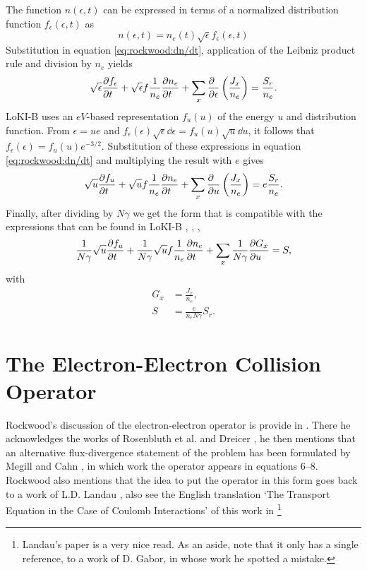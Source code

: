 \documentclass{book}
\begin{document}
The function $n(\epsilon,t)$ can be expressed in terms of a normalized distribution
function $f_\epsilon(\epsilon,t)$ as
\begin{equation}
	n(\epsilon,t) = n_e(t)\sqrt{\epsilon}f_\epsilon(\epsilon,t)
	\label{eq:rockwood:n}
\end{equation}
Substitution in equation \eqref{eq:rockwood:dn/dt}, application of the Leibniz
product rule and division by $n_e$ yields
\begin{equation}
	\sqrt{\epsilon}\PDEV{f_\epsilon}{t}
	+\sqrt{\epsilon}f\frac{1}{n_e}\PDEV{n_e}{t}
	+\sum_x\PDEV{}{\epsilon}\left(\frac{J_x}{n_e}\right) = \frac{S_r}{n_e}.
	\label{eq:rockwood:dn/dt-expanded}
\end{equation}
LoKI-B uses an $\si{eV}$-based representation $f_u(u)$ of the energy $u$ and distribution
function. From $\epsilon = ue$ and $f_\epsilon(\epsilon)\sqrt{\epsilon}\dd{\epsilon}
= f_u(u)\sqrt{u}\dd{u}$, it follows that $f_\epsilon(\epsilon) = f_u(u)e^{-3/2}$.
Substitution of these expressions in equation \eqref{eq:rockwood:dn/dt} and multiplying
the result with $e$ gives
\begin{equation}
	\sqrt{u}\PDEV{f_u}{t}
	+\sqrt{u}f\frac{1}{n_e}\PDEV{n_e}{t}
	+\sum_x\PDEV{}{u}\left(\frac{J_x}{n_e}\right) = e\frac{S_r}{n_e}.
	\label{eq:rockwood:dn/dt-eV}
\end{equation}
Finally, after dividing by $N\gamma$ we get the form that is compatible with
the expressions that can be found in LoKI-B \cite[eq 3a]{Tejero2019},
\cite[eq. 1]{Tejero2021}, \cite[eq. 7a]{Manual_2_2_0},
\begin{equation}
	\frac{1}{N\gamma}\sqrt{u}\PDEV{f_u}{t}
	+\frac{1}{N\gamma}\sqrt{u}f\frac{1}{n_e}\PDEV{n_e}{t}
	+\sum_x\frac{1}{N\gamma}\PDEV{G_x}{u}
	= S,
	\label{eq:rockwood:dn/dt-LoKI}
\end{equation}
with
\begin{align}
	G_x &= \frac{J_x}{n_e}, \label{eq:rockwood:G(J)} \\
	S   &= \frac{e}{n_eN\gamma}S_r. \label{eq:rockwood:S(Sr)}
\end{align}

\section{The Electron-Electron Collision Operator}
\label{sec:Rockwood1973EE}

Rockwood's discussion of the electron-electron operator is provide in
\cite[appendix B]{Rockwood1973}. There he acknowledges the works of
Rosenbluth et al. \cite{Rosenbluth1957} and Dreicer \cite[section V.]{Dreicer1960},
he then mentions that an alternative flux-divergence statement of the problem has
been formulated by Megill and Cahn \cite{Megill1964}, in which work the
operator appears in equations 6--8. Rockwood also mentions that the
idea to put the operator in this form goes back to a work of L.D. Landau
\cite{Landau1936}, also see the English translation `The Transport Equation
in the Case of Coulomb Interactions' of this work in
\cite[pp. 163--170]{TerHaar1965}\footnote{Landau's paper is a very nice read.
As an aside, note that it only has a single reference, to a work of D. Gabor, in
whose work he spotted a mistake.}
\end{document}
